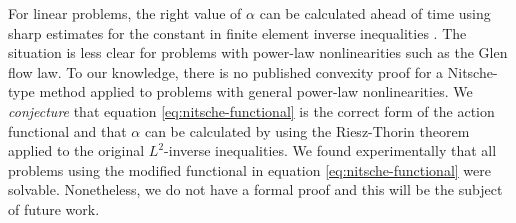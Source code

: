 \documentclass{article}
\theoremstyle{definition}
\theoremstyle{plain}
\begin{document}
For linear problems, the right value of $\alpha$ can be calculated ahead of time using sharp estimates for the constant in finite element inverse inequalities \citep{warburton2003constants}.
The situation is less clear for problems with power-law nonlinearities such as the Glen flow law.
To our knowledge, there is no published convexity proof for a Nitsche-type method applied to problems with general power-law nonlinearities.
We \emph{conjecture} that equation \eqref{eq:nitsche-functional} is the correct form of the action functional and that $\alpha$ can be calculated by using the Riesz-Thorin theorem applied to the original $L^2$-inverse inequalities.
We found experimentally that all problems using the modified functional in equation \eqref{eq:nitsche-functional} were solvable.
Nonetheless, we do not have a formal proof and this will be the subject of future work.


\pagebreak



\end{document}
